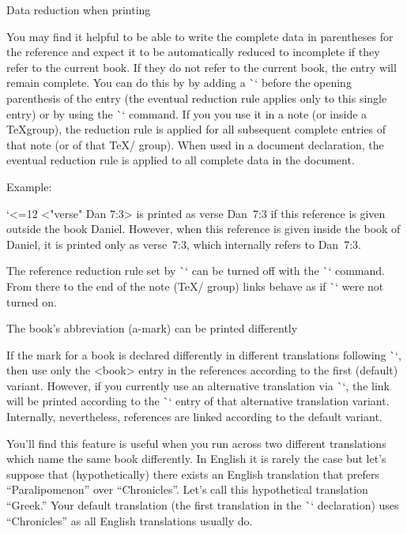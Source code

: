 \secc Data reduction when printing

You may find it helpful to be able to write the complete data in parentheses for the reference and expect it to be automatically  reduced to incomplete if they refer to the current book.
If they do not refer to the current book, the entry will remain complete. You can do this by
by adding a \`\re` before the opening parenthesis of the entry (the eventual reduction rule 
applies only to this single entry) or by using the \`\reduceref` command. If you
you use it in a note (or inside a \TeX group), the reduction rule is applied 
for all subsequent complete entries of that note (or of that \TeX/ group). 
When used in a document declaration, the eventual reduction rule is applied to all complete data in the document. 

Example:

\begtt \catcode`<=12
\re<"verse" Dan 7:3>
\endtt
is printed as {\Blue verse Dan~7:3} if this reference is given outside the book
Daniel. However, when this reference is given inside the book of Daniel, it is printed
only as {\Blue verse~7:3}, which internally refers to Dan~7:3. 

The reference reduction rule set by \`\reduceref` can be turned off 
with the \`\noreduceref` command. From there to the end of the note (\TeX/ group)
links behave as if \`\reduceref` were not turned on.




\secc[knihajinak] The book's abbreviation (a-mark) can be printed differently

If the mark for a book is declared differently in different translations following
\`\vdef`, then use only the <book> entry in the references according to the first (default)
variant. However, if you currently use an  alternative translation via \`\tmark`, 
the link will be printed according to the \`\vdef` entry of that alternative translation variant.
Internally, nevertheless, references are linked according to the default variant.

You'll find this feature is useful when you run across two different translations 
which name the same book differently.
In English it is rarely the case but let's suppose that (hypothetically) there exists an English 
translation that prefers “Paralipomenon” over “Chronicles”. Let's call this hypothetical 
translation “Greek.”
Your default translation (the first translation in the \`\variants` declaration)
uses “Chronicles” as all English translations usually do. 

